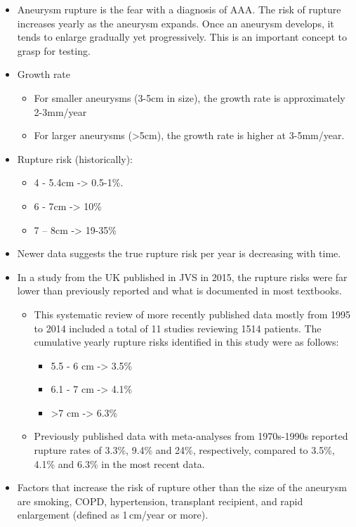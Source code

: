 \documentclass[
]{book}
\begin{document}
\begin{itemize}
\item
  Aneurysm rupture is the fear with a diagnosis of AAA. The risk of
  rupture increases yearly as the aneurysm expands. Once an aneurysm
  develops, it tends to enlarge gradually yet progressively. This is
  an important concept to grasp for testing.
\item
  Growth rate

  \begin{itemize}
  \item
    For smaller aneurysms (3-5cm in size), the growth rate is
    approximately 2-3mm/year
  \item
    For larger aneurysms (\textgreater5cm), the growth rate is higher at
    3-5mm/year.
  \end{itemize}
\item
  Rupture risk (historically):

  \begin{itemize}
  \item
    4 - 5.4cm -\textgreater{} 0.5-1\%.
  \item
    6 - 7cm -\textgreater{} 10\%
  \item
    7 -- 8cm -\textgreater{} 19-35\%
  \end{itemize}
\item
  Newer data suggests the true rupture risk per year is decreasing
  with time.
\item
  In a study from the UK published in JVS in 2015, the rupture risks
  were far lower than previously reported and what is documented in
  most textbooks. \citep{parkinsonRuptureRatesUntreated2015}

  \begin{itemize}
  \item
    This systematic review of more recently published data mostly
    from 1995 to 2014 included a total of 11 studies reviewing 1514
    patients. The cumulative yearly rupture risks identified in this
    study were as follows:

    \begin{itemize}
    \item
      5.5 - 6 cm -\textgreater{} 3.5\%
    \item
      6.1 - 7 cm -\textgreater{} 4.1\%
    \item
      \textgreater7 cm -\textgreater{} 6.3\%
    \end{itemize}
  \item
    Previously published data with meta-analyses from 1970s-1990s
    reported rupture rates of 3.3\%, 9.4\% and 24\%, respectively,
    compared to 3.5\%, 4.1\% and 6.3\% in the most recent data.
  \end{itemize}
\item
  Factors that increase the risk of rupture other than the size of the
  aneurysm are smoking, COPD, hypertension, transplant recipient, and
  rapid enlargement (defined as 1\,cm/year or more).
\end{itemize}
\end{document}
